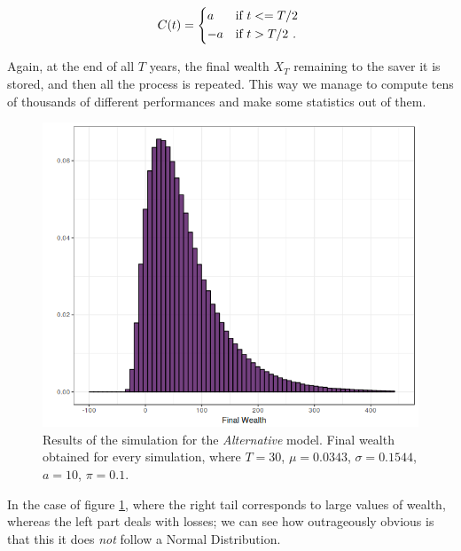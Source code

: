 \begin{equation*}
    C(t) =
    \begin{cases*}
      a & if $t <= T/2$ \\
      -a       & if $t > T/2$ \textit{.}
    \end{cases*}
\end{equation*}

Again, at the end of all $T$ years, the final wealth $X_T$ remaining to the saver it is stored, and then all the process is repeated. This way we manage to compute tens of thousands of different performances and make some statistics out of them.

\begin{figure}[H]
    \centering
    \includegraphics[scale=0.65]{./images/fw_alt.png}
    \caption{Results of the simulation for the \textit{Alternative} model. Final wealth obtained for every simulation, where $T=30$, $\mu = 0.0343$, $\sigma = 0.1544$, $a=10$, $\pi = 0.1$.}
    \label{fig:alt_fw}
\end{figure}

In the case of figure \ref{fig:alt_fw}, where the right tail corresponds to large values of wealth, whereas the left part deals with losses; we can see how outrageously obvious is that this it does \textit{not} follow a Normal Distribution.
